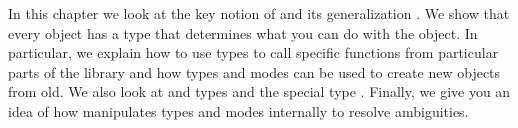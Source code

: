 
%
%
%
%
%


In this chapter we look at the key notion of  and its
generalization .
We show that every \Language{} object has a type that
determines what you can do with the object.
In particular, we explain how to use types to call specific functions
from particular parts of the library and how types and modes can be used
to create new objects from old.
We also look at  and  types and
the special type .
Finally, we give you an idea of how \Language{} manipulates types and
modes internally to resolve ambiguities.


